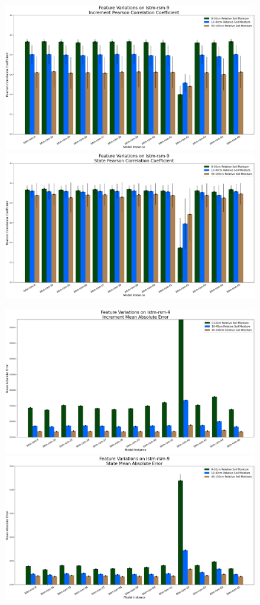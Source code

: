 \begin{figure}[hp!]
    \centering
    \includegraphics[width=.48\linewidth,draft=false]{figures/efficiency_variations/eval_test_efficiency_variations-feat-lstm-rsm-9_cc_res.png}
    \includegraphics[width=.48\linewidth,draft=false]{figures/efficiency_variations/eval_test_efficiency_variations-feat-lstm-rsm-9_cc_state.png}

    \includegraphics[width=.48\linewidth,draft=false]{figures/efficiency_variations/eval_test_efficiency_variations-feat-lstm-rsm-9_mae_res.png}
    \includegraphics[width=.48\linewidth,draft=false]{figures/efficiency_variations/eval_test_efficiency_variations-feat-lstm-rsm-9_mae_state.png}


\end{figure}
